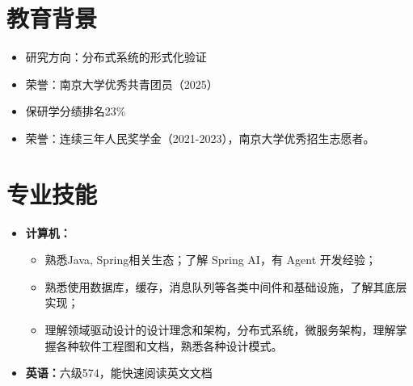 \documentclass{resume}
\begin{document}

% 

\section{教育背景}
\begin{itemize}
    \item 研究方向：分布式系统的形式化验证
    \item 荣誉：南京大学优秀共青团员（2025）
\end{itemize}
\begin{itemize}
    \item 保研学分绩排名23\%
    \item 荣誉：连续三年人民奖学金（2021-2023），南京大学优秀招生志愿者。
\end{itemize}

\section{专业技能}
\begin{itemize}
    \item \textbf{计算机：}
    \begin{itemize}
        \item 熟悉Java, Spring相关生态；了解 Spring AI，有 Agent 开发经验；
        \item 熟悉使用数据库，缓存，消息队列等各类中间件和基础设施，了解其底层实现；
        \item 理解领域驱动设计的设计理念和架构，分布式系统，微服务架构，理解掌握各种软件工程图和文档，熟悉各种设计模式。
    \end{itemize}
    \item \textbf{英语：}{六级574，能快速阅读英文文档}
\end{itemize}
\end{document}

